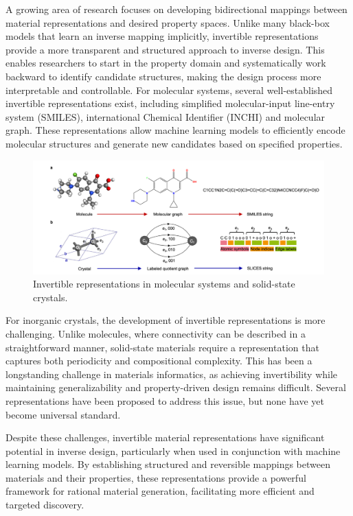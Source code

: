 A growing area of research focuses on developing bidirectional mappings between material representations and desired property spaces\cite{RN354,RN599}. Unlike many black-box models that learn an inverse mapping implicitly, invertible representations provide a more transparent and structured approach to inverse design. This enables researchers to start in the property domain and systematically work backward to identify candidate structures, making the design process more interpretable and controllable. For molecular systems, several well-established invertible representations exist, including simplified molecular-input line-entry system (SMILES), international Chemical Identifier (INCHI) and molecular graph\cite{RN648}. These representations allow machine learning models to efficiently encode molecular structures and generate new candidates based on specified properties. 

\begin{figure}[ht]
    \centering
    \includegraphics[width=\textwidth]{figures/literature-review/figure2-8.png}
    \caption{Invertible representations in molecular systems and solid-state crystals\cite{RN642}.}
    \label{fig:figure2.8}
\end{figure}

For inorganic crystals, the development of invertible representations is more challenging. Unlike molecules, where connectivity can be described in a straightforward manner, solid-state materials require a representation that captures both periodicity and compositional complexity. This has been a longstanding challenge in materials informatics, as achieving invertibility while maintaining generalizability and property-driven design remains difficult. Several representations have been proposed to address this issue, but none have yet become universal standard\cite{RN642,RN354}.

Despite these challenges, invertible material representations have significant potential in inverse design, particularly when used in conjunction with machine learning models. By establishing structured and reversible mappings between materials and their properties, these representations provide a powerful framework for rational material generation, facilitating more efficient and targeted discovery.

